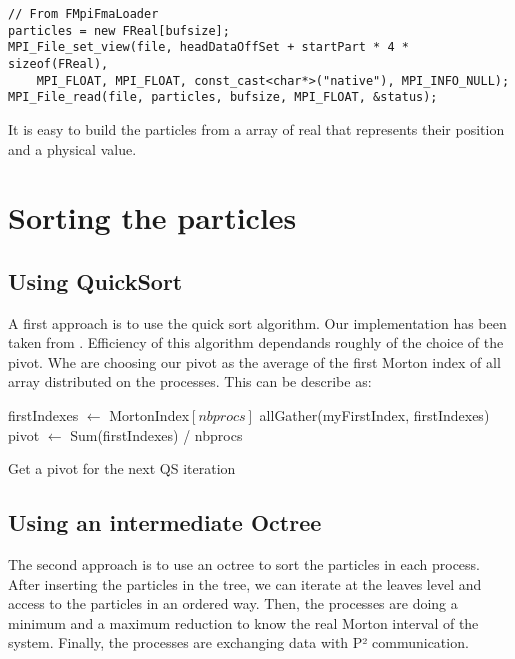 \documentclass[10pt,letterpaper,titlepage]{report}
\begin{document}
\begin{lstlisting}
// From FMpiFmaLoader
particles = new FReal[bufsize];
MPI_File_set_view(file, headDataOffSet + startPart * 4 * sizeof(FReal),
	MPI_FLOAT, MPI_FLOAT, const_cast<char*>("native"), MPI_INFO_NULL);
MPI_File_read(file, particles, bufsize, MPI_FLOAT, &status);
\end{lstlisting}

It is easy to build the particles from a array of real that represents their position and a physical value.


\section{Sorting the particles}
\subsection{Using QuickSort}
A first approach is to use the quick sort algorithm.
Our implementation has been taken from \cite{itpc03}.
Efficiency of this algorithm dependands roughly of the choice of the pivot.
Whe are choosing our pivot as the average of the first Morton index of all array distributed on the processes.
This can be describe as:

\begin{algorithm}[H]
\SetLine
{}
\BlankLine
firstIndexes $\leftarrow$ MortonIndex$[nbprocs]$\;
allGather(myFirstIndex, firstIndexes)\;
pivot $\leftarrow$ Sum(firstIndexes) / nbprocs\;
\BlankLine
\caption{Get a pivot for the next QS iteration}
\end{algorithm}


\subsection{Using an intermediate Octree}
The second approach is to use an octree to sort the particles in each process.
After inserting the particles in the tree, we can iterate at the leaves level and access to the particles in an ordered way.
Then, the processes are doing a minimum and a maximum reduction to know the real Morton interval of the system.
Finally, the processes are exchanging data with P² communication.
\end{document}
